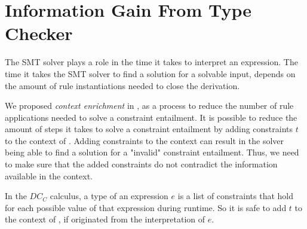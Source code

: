 \section{Information Gain From Type Checker}
The SMT solver plays a role in the time it takes
to interpret an expression.
The time it takes the SMT solver to find a
solution for a solvable input, depends on the amount
of rule instantiations needed to close the derivation.

We proposed \textit{context enrichment} in ,
as a process to reduce the number of rule applications needed
to solve a constraint entailment.
It is possible to reduce the amount of steps it takes
to solve a constraint entailment 
by adding constraints $t$ to the context of .
Adding constraints to the context
can result in the solver being able to find a solution for
a "invalid" constraint entailment.
Thus, we need to make sure that the added constraints
do not contradict the information available in the context.

In the $DC_C$ calculus, a type of an expression $e$ is a list of constraints that
hold for each possible value of that expression during runtime.
So it is safe to add $t$ to the context of ,
if  originated from the interpretation of $e$.
%

